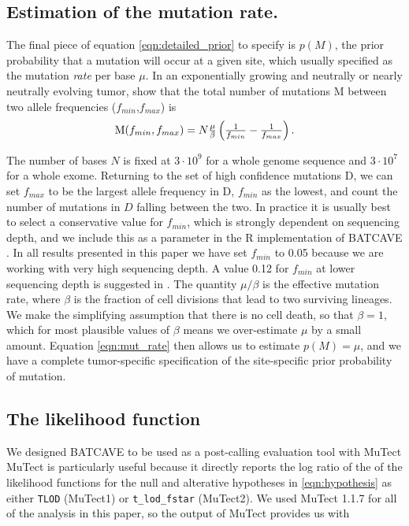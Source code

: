 \documentclass[a4,center,fleqn]{NAR}
\newcommand{\batcave}{BATCAVE }
\begin{document}
\subsection{Estimation of the mutation rate.}
The final piece of equation \ref{eqn:detailed_prior} to specify is $p(M)$, the prior probability that a mutation will occur at a given site, which usually specified as the mutation \textit{rate} per base $\mu$.
In an exponentially growing and neutrally or nearly neutrally evolving tumor, \citet{Williams2018} show that the total number of mutations $\mathrm{M}$ between two allele frequencies ($f_{min}$,$f_{max}$) is
\begin{equation}
  \label{eqn:mut_rate}
$$
  \mathrm{M}(f_{min},f_{max}) = N\frac{\mu}{\beta}\left(\frac{1}{f_{min}} - \frac{1}{f_{max}}\right).
$$
\end{equation}

The number of bases $N$ is fixed at $3\cdot10^9$ for a whole genome sequence and $3\cdot10^7$ for a whole exome.
Returning to the set of high confidence mutations $\mathrm{D}$, we can set $f_{max}$ to be the largest allele frequency in $\mathrm{D}$, $f_{min}$ as the lowest, and count the number of mutations in $D$ falling between the two.
In practice it is usually best to select a conservative value for $f_{min}$, which is strongly dependent on sequencing depth, and we include this as a parameter in the R implementation of \batcave.
In all results presented in this paper we have set $f_{min}$ to 0.05 because we are working with very high sequencing depth.
A value 0.12 for $f_{min}$ at lower sequencing depth is suggested in \citet{Williams2016}.
The quantity $\mu/\beta$ is the effective mutation rate, where $\beta$ is the fraction of cell divisions that lead to two surviving lineages.
We make the simplifying assumption that there is no cell death, so that $\beta = 1$, which for most plausible values of $\beta$ means we over-estimate $\mu$ by a small amount.
Equation \ref{eqn:mut_rate} then allows us to estimate $p(M) = \mu$, and we have a complete tumor-specific specification of the site-specific prior probability of mutation.

\subsection{The likelihood function}
We designed \batcave to be used as a post-calling evaluation tool with MuTect
MuTect is particularly useful because it directly reports the log ratio of the of the likelihood functions for the null and alterative hypotheses in \ref{eqn:hypothesis} as either \texttt{TLOD} (MuTect1) or \texttt{t\_lod\_fstar} (MuTect2).
We used MuTect 1.1.7 for all of the analysis in this paper, so the output of MuTect provides us with
\end{document}

